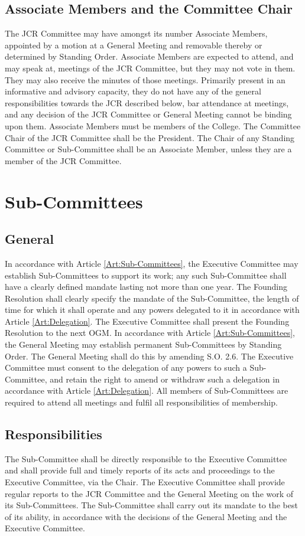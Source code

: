 \subsection{Associate Members and the Committee Chair}
\npara The JCR Committee may have amongst its number Associate Members, appointed by a motion at a General Meeting and removable thereby or determined by Standing Order. Associate Members are expected to attend, and may speak at, meetings of the JCR Committee, but they may not vote in them. They may also receive the minutes of those meetings. Primarily present in an informative and advisory capacity, they do not have any of the general responsibilities towards the JCR described below, bar attendance at meetings, and any decision of the JCR Committee or General Meeting cannot be binding upon them.  Associate Members must be members of the College.
\npara The Committee Chair of the JCR Committee shall be the President.
\npara The Chair of any Standing Committee or Sub-Committee shall be an Associate Member, unless they are a member of the JCR Committee.
\section{Sub-Committees}
\subsection{General}
\npara In accordance with Article \ref{Art:Sub-Committees}, the Executive Committee may establish Sub-Committees to support its work; any such Sub-Committee shall have a clearly defined mandate lasting not more than one year.  The Founding Resolution shall clearly specify the mandate of the Sub-Committee, the length of time for which it shall operate and any powers delegated to it in accordance with Article \ref{Art:Delegation}.  The Executive Committee shall present the Founding Resolution to the next OGM.
\npara In accordance with Article \ref{Art:Sub-Committees}, the General Meeting may establish permanent Sub-Committees by Standing Order.  The General Meeting shall do this by amending S.O. 2.6.  The Executive Committee must consent to the delegation of any powers to such a Sub-Committee, and retain the right to amend or withdraw such a delegation in accordance with Article \ref{Art:Delegation}.
\npara All members of Sub-Committees are required to attend all meetings and fulfil all responsibilities of membership.
\subsection{Responsibilities}
\npara The Sub-Committee shall be directly responsible to the Executive Committee and shall provide full and timely reports of its acts and proceedings to the Executive Committee, via the Chair.  The Executive Committee shall provide regular reports to the JCR Committee and the General Meeting on the work of its Sub-Committees.
\npara The Sub-Committee shall carry out its mandate to the best of its ability, in accordance with the decisions of the General Meeting and the Executive Committee.
